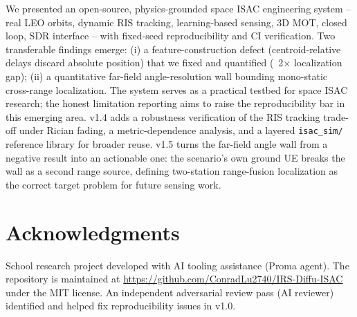 \documentclass[11pt]{article}
\begin{document}
We presented an open-source, physics-grounded space ISAC engineering system -- real LEO orbits, dynamic RIS tracking, learning-based sensing, 3D MOT, closed loop, SDR interface -- with fixed-seed reproducibility and CI verification. Two transferable findings emerge: (i) a feature-construction defect (centroid-relative delays discard absolute position) that we fixed and quantified (~2$\times$ localization gap); (ii) a quantitative far-field angle-resolution wall bounding mono-static cross-range localization. The system serves as a practical testbed for space ISAC research; the honest limitation reporting aims to raise the reproducibility bar in this emerging area. v1.4 adds a robustness verification of the RIS tracking trade-off under Rician fading, a metric-dependence analysis, and a layered \texttt{isac\_sim/} reference library for broader reuse. v1.5 turns the far-field angle wall from a negative result into an actionable one: the scenario's own ground UE breaks the wall as a second range source, defining two-station range-fusion localization as the correct target problem for future sensing work.


\section{Acknowledgments}

School research project developed with AI tooling assistance (Proma agent). The repository is maintained at \href{https://github.com/ConradLu2740/IRS-Diffu-ISAC}{https://github.com/ConradLu2740/IRS-Diffu-ISAC} under the MIT license. An independent adversarial review pass (AI reviewer) identified and helped fix reproducibility issues in v1.0.
\end{document}
